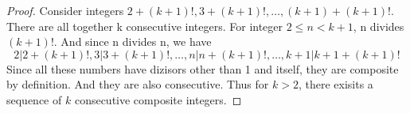 \documentclass[11pt,a4paper]{article}
\begin{document}
\begin{enumerate}
	\begin{proof}
		Consider integers $2+(k+1)!, 3+(k+1)!, \ldots, (k+1)+(k+1)!.$ There are all together k consecutive integers. For integer $2\leq n  < k+1$, n divides $(k+1)!$. And since n divides n, we have \[ 2|2+(k+1)!, 3|3+(k+1)!, \ldots, n|n+(k+1)!, \dots, k+1|k+1+(k+1)! \] Since all these numbers have dizisors other than 1 and itself, they are composite by definition. And they are also consecutive. Thus for $k>2$, there exisits a sequence of $k$ consecutive composite integers. 
	\end{proof}

\end{enumerate}
\end{document}
